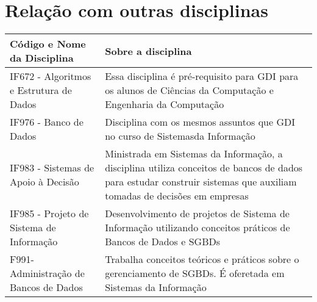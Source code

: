 \documentclass[10pt]{article}
\begin{document}
\section{Relação com outras disciplinas}
\begin{table}[ht]
\begin{tabular}{|l|p{7cm}|}
\hline
\textbf{Código e Nome da Disciplina}     & \textbf{Sobre a disciplina}                                                                                                                                          \\ \hline
IF672 - Algoritmos e Estrutura de Dados  & Essa disciplina é pré-requisito para GDI para os alunos de Ciências da Computação e Engenharia da Computação                                                         \\ \hline
IF976 - Banco de Dados                   & Disciplina com os mesmos assuntos que GDI no curso de Sistemasda Informação                                                                                          \\ \hline
IF983 - Sistemas de Apoio à Decisão      & Ministrada em Sistemas da Informação, a disciplina utiliza conceitos de bancos de dados para estudar construir sistemas que auxiliam tomadas de decisões em empresas \\ \hline
IF985 - Projeto de Sistema de Informação & Desenvolvimento de projetos de Sistema de Informação utilizando conceitos práticos de Bancos de Dados e SGBDs                                                        \\ \hline
F991- Administração de Bancos de Dados   & Trabalha conceitos teóricos e práticos sobre o gerenciamento de SGBDs. É oferetada em Sistemas da Informação                                                         \\ \hline
\end{tabular}
\end{table}




\end{document}
